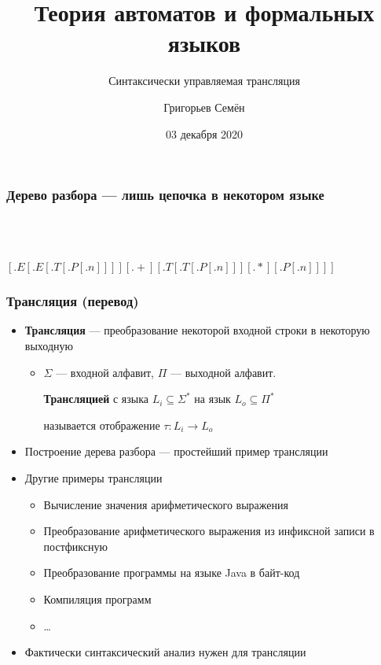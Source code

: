\documentclass{beamer}
\title[]{Теория автоматов и формальных языков}
\subtitle[]{Синтаксически управляемая трансляция}
\institute[]{
Санкт-Петербургский государственный университет\\
}
\author[]{Григорьев Семён}
\date{03 декабря 2020}
\begin{document}
{
  \begin{frame}
    \titlepage
  \end{frame}
}

\begin{frame}[fragile]
  \transwipe[direction=90]
  \frametitle{Дерево разбора --- лишь цепочка в некотором языке }
\begin{center}
  \pause

  ~\\~

$[.E [.E [.T [.P [.n ] ] ] ] [.+ ] [.T [.T [.P [.n ] ] ] [.* ] [.P [.n ] ] ] ]$
\end{center}
\end{frame}


\begin{frame}[fragile]
  \transwipe[direction=90]
  \frametitle{Трансляция (перевод)}
  \begin{itemize}
    \item \textbf{Трансляция} --- преобразование некоторой входной строки в некоторую выходную
    \begin{itemize}
      \item $\Sigma$ --- входной алфавит, $\Pi$ --- выходной алфавит.

      \textbf{Трансляцией} с языка $L_i \subseteq \Sigma^*$ на язык $L_o \subseteq \Pi^*$

      называется отображение $\tau : L_i \rightarrow L_o$
    \end{itemize}
    \item Построение дерева разбора --- простейший пример трансляции
    \item Другие примеры трансляции
    \begin{itemize}
      \item Вычисление значения арифметического выражения
      \item Преобразование арифметического выражения из инфиксной записи в постфиксную
      \item Преобразование программы на языке Java в байт-код
      \item Компиляция программ
      \item \dots
    \end{itemize}
    \item Фактически синтаксический анализ нужен для трансляции
  \end{itemize}
\end{frame}
\end{document}
